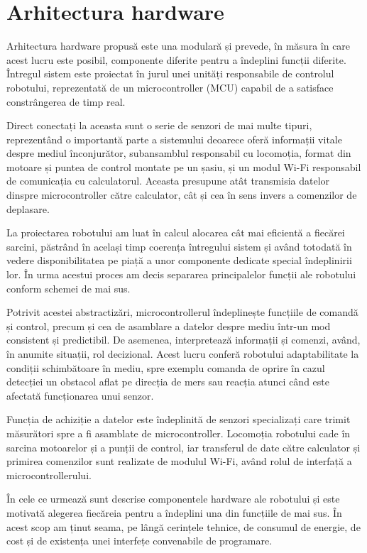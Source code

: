\chapter{Arhitectura hardware}

Arhitectura hardware propusă este una modulară și prevede, în măsura în care acest lucru este posibil, componente diferite pentru a îndeplini funcții diferite. Întregul sistem este proiectat în jurul unei unități responsabile de controlul robotului, reprezentată de un microcontroller (MCU) capabil de a satisface constrângerea de timp real.


Direct conectați la aceasta sunt o serie de senzori de mai multe tipuri, reprezentând o importantă parte a sistemului deoarece oferă informații vitale despre mediul înconjurător, subansamblul responsabil cu locomoția, format din motoare și puntea de control montate pe un șasiu, și un modul Wi-Fi responsabil de comunicația cu calculatorul. Aceasta presupune atât transmisia datelor dinspre microcontroller către calculator, cât și cea în sens invers a comenzilor de deplasare.\bigskip

La proiectarea robotului am luat în calcul alocarea cât mai eficientă a fiecărei sarcini, păstrând în același timp coerența întregului sistem și având totodată în vedere disponibilitatea pe piață a unor componente dedicate special îndeplinirii lor. În urma acestui proces am decis separarea principalelor funcții ale robotului conform schemei de mai sus.

Potrivit acestei abstractizări, microcontrollerul îndeplinește funcțiile de comandă și control, precum și cea de asamblare a datelor despre mediu într-un mod consistent și predictibil. De asemenea, interpretează informații și comenzi, având, în anumite situații, rol decizional. Acest lucru conferă robotului adaptabilitate la condiții schimbătoare în mediu, spre exemplu comanda de oprire în cazul detecției un obstacol aflat pe direcția de mers sau reacția atunci când este afectată funcționarea unui senzor.

Funcția de achiziție a datelor este îndeplinită de senzori specializați care trimit măsurători spre a fi asamblate de microcontroller. Locomoția robotului cade în sarcina motoarelor și a punții de control, iar transferul de date către calculator și primirea comenzilor sunt realizate de modulul Wi-Fi, având rolul de interfață a microcontrollerului.

În cele ce urmează sunt descrise componentele hardware ale robotului și este motivată alegerea fiecăreia pentru a îndeplini una din funcțiile de mai sus. În acest scop am ținut seama, pe lângă cerințele tehnice, de consumul de energie, de cost și de existența unei interfețe convenabile de programare.

